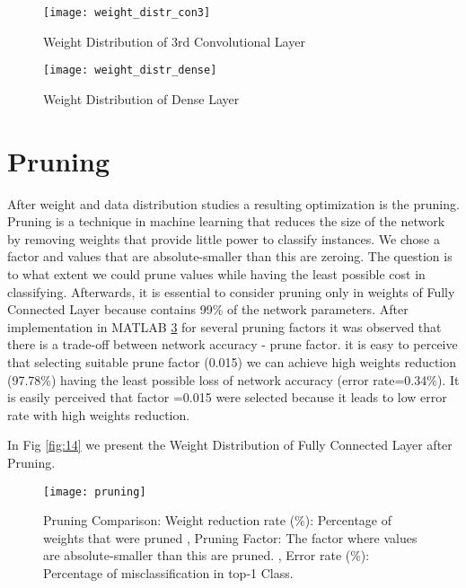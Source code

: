\begin{figure}[H]
\centering
\texttt{[image: weight\_distr\_con3]} 
\decoRule
\caption[Weight Distribution of conv3]{Weight Distribution of 3rd Convolutional Layer
}
\label{fig:11}
\end{figure}

\begin{figure}[H]
\centering
\texttt{[image: weight\_distr\_dense]} 
\decoRule
\caption[Weight Distribution of dense]{Weight Distribution of Dense Layer
}
\label{fig:12}
\end{figure}
 
 \section{Pruning}

After weight and data distribution studies a resulting optimization is the pruning. Pruning is a technique in machine learning that reduces the size of the network by removing weights that provide little power to classify instances. We chose a factor and values that are absolute-smaller than this are zeroing. The question is to what extent we could prune values while having the least possible cost in classifying. Afterwards, it is essential to consider pruning only in weights of Fully Connected Layer because contains 99\% of the network parameters. After implementation in MATLAB \ref{fig:13} for several pruning factors it was observed that there is a trade-off between network accuracy - prune factor.
it is easy to perceive that selecting suitable prune factor (0.015) we can achieve high weights reduction (97.78\%) having the least possible loss of network accuracy (error rate=0.34\%). It is easily perceived that factor =0.015 were selected because it leads to low error rate with high weights reduction.
 
In Fig \ref{fig:14} we present the Weight Distribution of Fully Connected Layer after Pruning. 

\begin{figure}[H]
\centering
\texttt{[image: pruning]} 
\decoRule
\caption[Pruning Comparison]{Pruning Comparison: 
Weight reduction rate (\%): Percentage of weights that were pruned 
,  Pruning Factor: The factor where values are absolute-smaller than this are pruned.
, Error rate (\%): Percentage of misclassification in top-1 Class.
}
\label{fig:13}
\end{figure}


